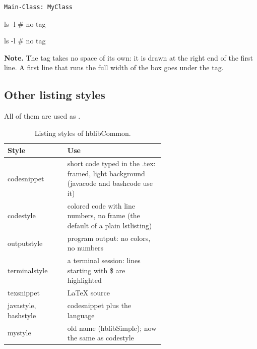 \documentclass[11pt]{amsart}         %
\newcommand{\hNote}[1]{\par\smallskip\noindent\colorbox{codebg}{\parbox{\dimexpr\linewidth-2\fboxsep}{\small\raggedright\textbf{Note.} #1}}\par\smallskip}
\begin{document}
\begin{lstlisting}[style=outputstyle, frame=single, rulecolor=\color{gray!40}]
Main-Class: MyClass
\end{lstlisting}

\begin{texcode}
\hCodeTagsfalse
\begin{bashcode}
ls -l    # no tag
\end{bashcode}
\hCodeTagstrue
\end{texcode}

\hCodeTagsfalse
\begin{bashcode}
ls -l    # no tag
\end{bashcode}
\hCodeTagstrue

\hNote{The tag takes no space of its own: it is drawn at the right end of the first line.
A first line that runs the full width of the box goes under the tag.}


\subsection{Other listing styles}

All of them are used as .

\begin{table}[htbp]
\caption{Listing styles of hblibCommon.}
\label{tbl:styles}
\small
\begin{tabular}{@{}>{\ttfamily}l >{\raggedright\arraybackslash}p{0.62\linewidth}@{}}
	\toprule
	\textrm{\textbf{Style}} & \textbf{Use} \\
	\midrule
	codesnippet   & short code typed in the .tex: framed, light background (javacode and bashcode use it) \\
	codestyle     & colored code with line numbers, no frame (the default of a plain lstlisting) \\
	outputstyle   & program output: no colors, no numbers \\
	terminalstyle & a terminal session: lines starting with \$ are highlighted \\
	texsnippet    & LaTeX source \\
	javastyle, bashstyle & codesnippet plus the language \\
	mystyle       & old name (hblibSimple); now the same as codestyle \\
	\bottomrule
\end{tabular}
\end{table}%
\end{document}

